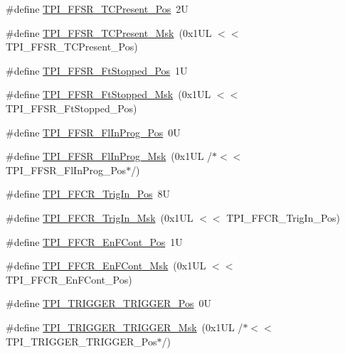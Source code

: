 \begin{DoxyCompactItemize}
\item 
\#define \hyperlink{group___c_m_s_i_s___t_p_i_gad30fde0c058da2ffb2b0a213be7a1b5c}{T\+P\+I\+\_\+\+F\+F\+S\+R\+\_\+\+T\+C\+Present\+\_\+\+Pos}~2U
\item 
\#define \hyperlink{group___c_m_s_i_s___t_p_i_ga0d6bfd263ff2fdec72d6ec9415fb1135}{T\+P\+I\+\_\+\+F\+F\+S\+R\+\_\+\+T\+C\+Present\+\_\+\+Msk}~(0x1\+U\+L $<$$<$ T\+P\+I\+\_\+\+F\+F\+S\+R\+\_\+\+T\+C\+Present\+\_\+\+Pos)
\item 
\#define \hyperlink{group___c_m_s_i_s___t_p_i_gaedf31fd453a878021b542b644e2869d2}{T\+P\+I\+\_\+\+F\+F\+S\+R\+\_\+\+Ft\+Stopped\+\_\+\+Pos}~1U
\item 
\#define \hyperlink{group___c_m_s_i_s___t_p_i_ga1ab6c3abe1cf6311ee07e7c479ce5f78}{T\+P\+I\+\_\+\+F\+F\+S\+R\+\_\+\+Ft\+Stopped\+\_\+\+Msk}~(0x1\+U\+L $<$$<$ T\+P\+I\+\_\+\+F\+F\+S\+R\+\_\+\+Ft\+Stopped\+\_\+\+Pos)
\item 
\#define \hyperlink{group___c_m_s_i_s___t_p_i_ga542ca74a081588273e6d5275ba5da6bf}{T\+P\+I\+\_\+\+F\+F\+S\+R\+\_\+\+Fl\+In\+Prog\+\_\+\+Pos}~0U
\item 
\#define \hyperlink{group___c_m_s_i_s___t_p_i_ga63dfb09259893958962914fc3a9e3824}{T\+P\+I\+\_\+\+F\+F\+S\+R\+\_\+\+Fl\+In\+Prog\+\_\+\+Msk}~(0x1\+U\+L /$\ast$$<$$<$ T\+P\+I\+\_\+\+F\+F\+S\+R\+\_\+\+Fl\+In\+Prog\+\_\+\+Pos$\ast$/)
\item 
\#define \hyperlink{group___c_m_s_i_s___t_p_i_gaa7ea11ba6ea75b541cd82e185c725b5b}{T\+P\+I\+\_\+\+F\+F\+C\+R\+\_\+\+Trig\+In\+\_\+\+Pos}~8U
\item 
\#define \hyperlink{group___c_m_s_i_s___t_p_i_ga360b413bc5da61f751546a7133c3e4dd}{T\+P\+I\+\_\+\+F\+F\+C\+R\+\_\+\+Trig\+In\+\_\+\+Msk}~(0x1\+U\+L $<$$<$ T\+P\+I\+\_\+\+F\+F\+C\+R\+\_\+\+Trig\+In\+\_\+\+Pos)
\item 
\#define \hyperlink{group___c_m_s_i_s___t_p_i_ga99e58a0960b275a773b245e2b69b9a64}{T\+P\+I\+\_\+\+F\+F\+C\+R\+\_\+\+En\+F\+Cont\+\_\+\+Pos}~1U
\item 
\#define \hyperlink{group___c_m_s_i_s___t_p_i_ga27d1ecf2e0ff496df03457a2a97cb2c9}{T\+P\+I\+\_\+\+F\+F\+C\+R\+\_\+\+En\+F\+Cont\+\_\+\+Msk}~(0x1\+U\+L $<$$<$ T\+P\+I\+\_\+\+F\+F\+C\+R\+\_\+\+En\+F\+Cont\+\_\+\+Pos)
\item 
\#define \hyperlink{group___c_m_s_i_s___t_p_i_ga5517fa2ced64efbbd413720329c50b99}{T\+P\+I\+\_\+\+T\+R\+I\+G\+G\+E\+R\+\_\+\+T\+R\+I\+G\+G\+E\+R\+\_\+\+Pos}~0U
\item 
\#define \hyperlink{group___c_m_s_i_s___t_p_i_ga814227af2b2665a0687bb49345e21110}{T\+P\+I\+\_\+\+T\+R\+I\+G\+G\+E\+R\+\_\+\+T\+R\+I\+G\+G\+E\+R\+\_\+\+Msk}~(0x1\+U\+L /$\ast$$<$$<$ T\+P\+I\+\_\+\+T\+R\+I\+G\+G\+E\+R\+\_\+\+T\+R\+I\+G\+G\+E\+R\+\_\+\+Pos$\ast$/)

\end{DoxyCompactItemize}
